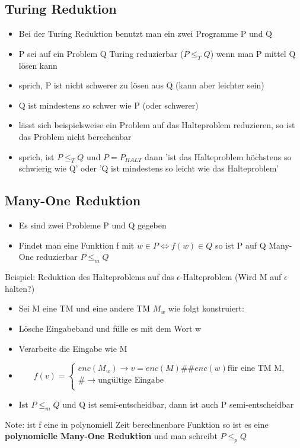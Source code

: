 \documentclass[12pt,a4paper]{article}
\begin{document}
\subsection{Turing Reduktion}
\begin{itemize}
\item Bei der Turing Reduktion benutzt man ein zwei Programme P und Q
\item P sei auf ein Problem Q Turing reduzierbar ($P \leq_T Q$) wenn man P mittel Q lösen kann
\item sprich, P ist nicht schwerer zu lösen aus Q (kann aber leichter sein)
\item Q ist mindestens so schwer wie P (oder schwerer)
\item lässt sich beispielsweise ein Problem auf das Halteproblem reduzieren, so ist das Problem nicht berechenbar
\item sprich, ist $P \leq_T Q$ und $P=P_{HALT}$ dann 'ist das Halteproblem höchstens so schwierig wie Q' oder 'Q ist mindestens so leicht wie das Halteproblem'
\end{itemize}

\subsection{Many-One Reduktion}
\begin{itemize}
\item Es sind zwei Probleme P und Q gegeben
\item Findet man eine Funktion f mit $w \in P \Leftrightarrow f(w) \in Q$ so ist P auf Q Many-One reduzierbar $P \leq_m Q$
\end{itemize}
Beispiel: Reduktion des Halteproblems auf das $\epsilon$-Halteproblem (Wird M auf $\epsilon$ halten?)
\begin{itemize}
\item Sei M eine TM und eine andere TM $M_w$ wie folgt konstruiert:
\item Lösche Eingabeband und fülle es mit dem Wort w
\item Verarbeite die Eingabe wie M
\item $$ f(v) = 
\begin{cases}
enc(M_w) \rightarrow v=enc(M)\#\#enc(w) \text{für eine TM M},\\
\# \rightarrow \text{ungültige Eingabe}\\
\end{cases}
$$
\item Ist $P \leq_m Q$ und Q ist semi-entscheidbar, dann ist auch P semi-entscheidbar
\end{itemize}
Note: ist f eine in polynomiell Zeit berechnenbare Funktion so ist es eine \textbf{polynomielle Many-One Reduktion} und man schreibt $P \leq_p Q$
\end{document}
